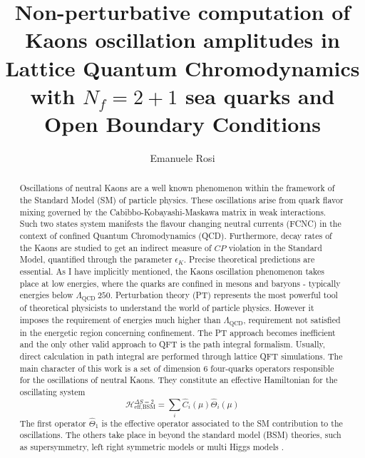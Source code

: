 \documentclass[english, LaM, oneside, noexaminfo]{sapthesis}
\title{Non-perturbative computation of Kaons oscillation amplitudes in Lattice Quantum Chromodynamics with $N_f = 2+1$ sea quarks and Open Boundary Conditions}
\author{Emanuele Rosi}
\newcommand{\mev}{\text{ MeV}}
\begin{document}
\frontmatter
\maketitle

\dedication{
    \hspace*{.76\textwidth}A mamma, a papà.
    \newline
    \newline
    \newline
    \newline
    A tutte quelle giornate in cui non mi stavo sacrificando per lo studio, stavo facendo ciò che amo.
}

\begin{abstract}
    Oscillations of neutral Kaons are a well known phenomenon within the framework of the Standard Model (SM) of particle physics.
    These oscillations arise from quark flavor mixing governed by the Cabibbo-Kobayashi-Maskawa matrix in weak interactions.
    Such two states system manifests the flavour changing neutral currents (FCNC) in the context of confined Quantum Chromodynamics (QCD).
    Furthermore, decay rates of the Kaons are studied to get an indirect measure of $CP$ violation in the Standard Model, quantified through the parameter $\epsilon_K$.
    Precise theoretical predictions are essential.
    As I have implicitly mentioned, the Kaons oscillation phenomenon takes place at low energies, where the quarks are confined in mesons and baryons - typically energies below $\Lambda_\text{QCD} ~ 250$\mev \cite{WeinbergII}.
    Perturbation theory (PT) represents the most powerful tool of theoretical physicists to understand the world of particle physics.
    However it imposes the requirement of energies much higher than $\Lambda_\text{QCD}$, requirement not satisfied in the energetic region concerning confinement.
    The PT approach becomes inefficient and the only other valid approach to QFT is the path integral formalism.
    Usually, direct calculation in path integral are performed through lattice QFT simulations.
    \newline
    The main character of this work is a set of dimension 6 four-quarks operators responsible for the oscillations of neutral Kaons.
    They constitute an effective Hamiltonian for the oscillating system
    $$ \mathcal{H}^{\Delta S=2}_\text{eff,BSM} = \sum_i \hat C_i (\mu) \hat\Theta_i (\mu) $$
    The first operator $\hat\Theta_1$ is the effective operator associated to the SM contribution to the oscillations.
    The others take place in beyond the standard model (BSM) theories, such as supersymmetry, left right symmetric models or multi Higgs models \cite{Bparameters}.

\end{abstract}
\end{document}
